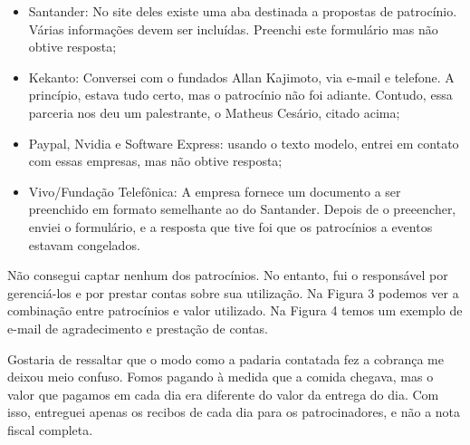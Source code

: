 \documentclass[12pt,letterpaper]{article}
\begin{document}
	\begin{itemize}
		\item Santander: No site deles existe uma aba destinada a propostas de patrocínio. Várias informações devem ser incluídas. Preenchi este formulário mas não obtive resposta;
		\item Kekanto: Conversei com o fundados Allan Kajimoto, via e-mail e telefone. A princípio, estava tudo certo, mas o patrocínio não foi adiante. Contudo, essa parceria nos deu um palestrante, o Matheus Cesário, citado acima;
		\item Paypal, Nvidia e Software Express: usando o texto modelo\cite{modelo_pat}, entrei em contato com essas empresas, mas não obtive resposta;
		\item Vivo/Fundação Telefônica: A empresa fornece um documento a ser preenchido em formato semelhante ao do Santander. Depois de o preeencher, enviei o formulário, e a resposta que tive foi que os patrocínios a eventos estavam congelados.
	\end{itemize}
	
	Não consegui captar nenhum dos patrocínios. No entanto, fui o responsável por gerenciá-los e por prestar contas sobre sua utilização.
	Na Figura 3 podemos ver a combinação entre patrocínios e valor utilizado. Na Figura 4 temos um exemplo de e-mail de agradecimento e prestação de contas.
	
	Gostaria de ressaltar que o modo como a padaria contatada fez a cobrança me deixou meio confuso. Fomos pagando à medida que a comida chegava, mas o valor que pagamos em cada dia era diferente do valor da entrega do dia. Com isso, entreguei apenas os recibos de cada dia para os patrocinadores, e não a nota fiscal completa.
	
\end{document}
